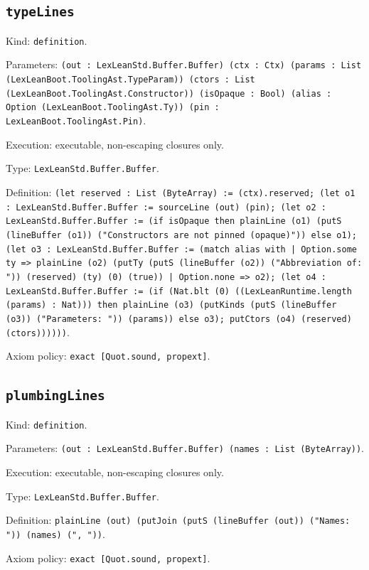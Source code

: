 \documentclass[11pt]{article}
\begin{document}
\subsection*{\texttt{typeLines}}
\noindent Kind: \texttt{definition}.\par
\noindent Parameters: \texttt{(out : LexLeanStd.Buffer.Buffer) (ctx : Ctx) (params : List (LexLeanBoot.ToolingAst.TypeParam)) (ctors : List (LexLeanBoot.ToolingAst.Constructor)) (isOpaque : Bool) (alias : Option (LexLeanBoot.ToolingAst.Ty)) (pin : LexLeanBoot.ToolingAst.Pin)}.\par
\noindent Execution: executable, non-escaping closures only.\par
\noindent Type: \texttt{LexLeanStd.Buffer.Buffer}.\par
\noindent Definition: \texttt{(let reserved : List (ByteArray) := (ctx).reserved; (let o1 : LexLeanStd.Buffer.Buffer := sourceLine (out) (pin); (let o2 : LexLeanStd.Buffer.Buffer := (if isOpaque then plainLine (o1) (putS (lineBuffer (o1)) ("Constructors are not pinned (opaque)")) else o1); (let o3 : LexLeanStd.Buffer.Buffer := (match alias with | Option.some ty => plainLine (o2) (putTy (putS (lineBuffer (o2)) ("Abbreviation of: ")) (reserved) (ty) (0) (true)) | Option.none => o2); (let o4 : LexLeanStd.Buffer.Buffer := (if (Nat.blt (0) ((LexLeanRuntime.length (params) : Nat))) then plainLine (o3) (putKinds (putS (lineBuffer (o3)) ("Parameters: ")) (params)) else o3); putCtors (o4) (reserved) (ctors))))))}.\par
\noindent Axiom policy: \texttt{exact [Quot.sound, propext]}.\par
\subsection*{\texttt{plumbingLines}}
\noindent Kind: \texttt{definition}.\par
\noindent Parameters: \texttt{(out : LexLeanStd.Buffer.Buffer) (names : List (ByteArray))}.\par
\noindent Execution: executable, non-escaping closures only.\par
\noindent Type: \texttt{LexLeanStd.Buffer.Buffer}.\par
\noindent Definition: \texttt{plainLine (out) (putJoin (putS (lineBuffer (out)) ("Names: ")) (names) (", "))}.\par
\noindent Axiom policy: \texttt{exact [Quot.sound, propext]}.\par
\end{document}
